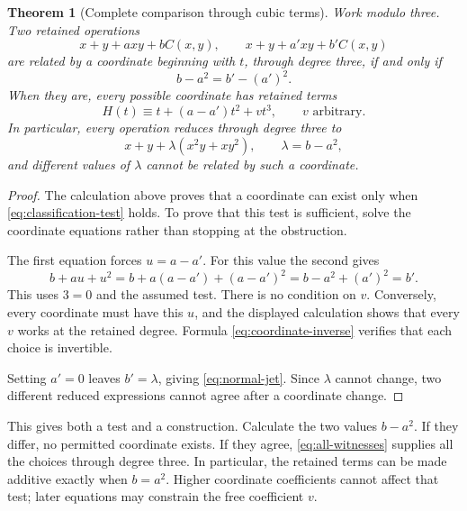 \documentclass[11pt,letterpaper]{article}
\numberwithin{equation}{section}
\newtheorem{theorem}{Theorem}[section]
\theoremstyle{definition}\newtheorem{example}[theorem]{Example}
\begin{document}
\begin{theorem}[Complete comparison through cubic terms]\label{thm:cubic}
Work modulo three. Two retained operations
\[
 x+y+a xy+bC(x,y),\qquad x+y+a'xy+b'C(x,y)
\]
are related by a coordinate beginning with \(t\), through degree three, if and only if
\begin{equation}\label{eq:classification-test}
 b-a^2=b'-(a')^2.
\end{equation}
When they are, every possible coordinate has retained terms
\begin{equation}\label{eq:all-witnesses}
 H(t)\equiv t+(a-a')t^2+vt^3,
 \qquad v\text{ arbitrary}.
\end{equation}
In particular, every operation reduces through degree three to
\begin{equation}\label{eq:normal-jet}
 x+y+\lambda(x^2y+xy^2),\qquad \lambda=b-a^2,
\end{equation}
and different values of \(\lambda\) cannot be related by such a coordinate.
\end{theorem}

\begin{proof}
The calculation above proves that a coordinate can exist only when \eqref{eq:classification-test} holds. To prove that this test is sufficient, solve the coordinate equations rather than stopping at the obstruction.

The first equation forces \(u=a-a'\). For this value the second gives
\[
 b+au+u^2=b+a(a-a')+(a-a')^2
 =b-a^2+(a')^2=b'.
\]
This uses \(3=0\) and the assumed test. There is no condition on \(v\). Conversely, every coordinate must have this \(u\), and the displayed calculation shows that every \(v\) works at the retained degree. Formula \eqref{eq:coordinate-inverse} verifies that each choice is invertible.

Setting \(a'=0\) leaves \(b'=\lambda\), giving \eqref{eq:normal-jet}. Since \(\lambda\) cannot change, two different reduced expressions cannot agree after a coordinate change.
\end{proof}

This gives both a test and a construction. Calculate the two values \(b-a^2\). If they differ, no permitted coordinate exists. If they agree, \eqref{eq:all-witnesses} supplies all the choices through degree three. In particular, the retained terms can be made additive exactly when \(b=a^2\). Higher coordinate coefficients cannot affect that test; later equations may constrain the free coefficient \(v\).
\end{document}

